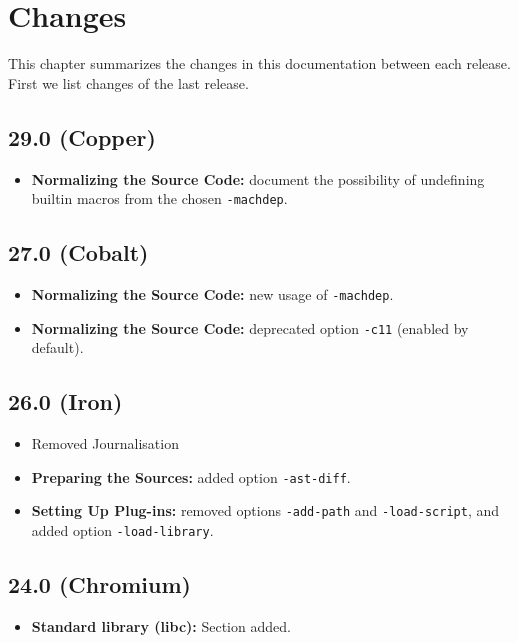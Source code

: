\chapter{Changes}\label{chap:changes}

This chapter summarizes the changes in this documentation between each \FramaC
release. First we list changes of the last release.


\section*{29.0 (Copper)}
\begin{itemize}
\item \textbf{Normalizing the Source Code:} document the possibility of
  undefining builtin macros from the chosen \texttt{-machdep}.
\end{itemize}

\section*{27.0 (Cobalt)}
\begin{itemize}
\item \textbf{Normalizing the Source Code:} new usage of \texttt{-machdep}.
\item \textbf{Normalizing the Source Code:} deprecated option \texttt{-c11}
  (enabled by default).
\end{itemize}

\section*{26.0 (Iron)}
\begin{itemize}
\item Removed Journalisation
\item \textbf{Preparing the Sources:} added option \texttt{-ast-diff}.
\item \textbf{Setting Up Plug-ins:} removed options \texttt{-add-path} and
  \texttt{-load-script}, and added option \texttt{-load-library}.
\end{itemize}

\section*{24.0 (Chromium)}
\begin{itemize}
\item \textbf{Standard library (libc):} Section added.
\end{itemize}

